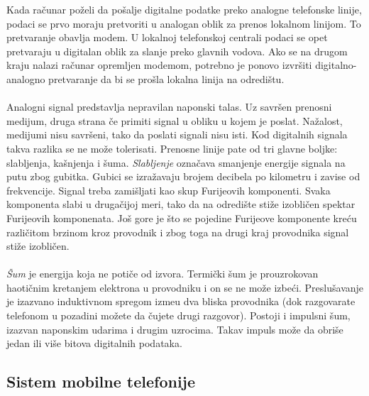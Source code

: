 \documentclass{article} %
\begin{document}
Kada ra\v cunar po\v zeli da po\v salje digitalne podatke preko analogne telefonske linije, podaci se prvo moraju pretvoriti u analogan oblik za prenos lokalnom linijom. To pretvaranje obavlja modem. U lokalnoj telefonskoj centrali podaci se opet pretvaraju u digitalan oblik za slanje preko glavnih vodova. Ako se na drugom kraju nalazi ra\v cunar opremljen modemom, potrebno je ponovo izvr\v siti digitalno-analogno pretvaranje da bi se pro\v sla lokalna linija na odredi\v stu.
\\
\\ Analogni signal predstavlja nepravilan naponski talas. Uz savr\v sen prenosni medijum, druga strana \v ce primiti signal u obliku u kojem je poslat. Na\v zalost, medijumi nisu savr\v seni, tako da poslati signali nisu isti. Kod digitalnih signala takva razlika se ne mo\v ze tolerisati. Prenosne linije pate od tri glavne boljke: slabljenja, ka\v snjenja i \v suma. \textit{Slabljenje} ozna\v cava smanjenje energije signala na putu zbog gubitka. Gubici se izra\v zavaju brojem decibela po kilometru i zavise od frekvencije. Signal treba zami\v sljati kao skup Furijeovih komponenti. Svaka komponenta slabi u druga\v cijoj meri, tako da na odredi\v ste sti\v ze izobli\v cen spektar Furijeovih komponenata. Jo\v s gore je \v sto se pojedine Furijeove komponente kre\' cu razli\v citom brzinom kroz provodnik i zbog toga na drugi kraj provodnika signal sti\v ze izobli\v cen.
\\
\\ \textit{\v Sum} je energija koja ne poti\v ce od izvora. Termi\v cki \v sum je prouzrokovan haoti\v cnim kretanjem elektrona u provodniku i on se ne mo\v ze izbe\' ci. Preslu\v savanje je izazvano induktivnom spregom izme\dj u dva bliska provodnika (dok razgovarate telefonom u pozadini mo\v zete da \v cujete drugi razgovor). Postoji i impulsni \v sum, izazvan naponskim udarima i drugim uzrocima. Takav impuls mo\v ze da obri\v se jedan ili vi\v se bitova digitalnih podataka.

 
\subsection{Sistem mobilne telefonije}
\end{document}
